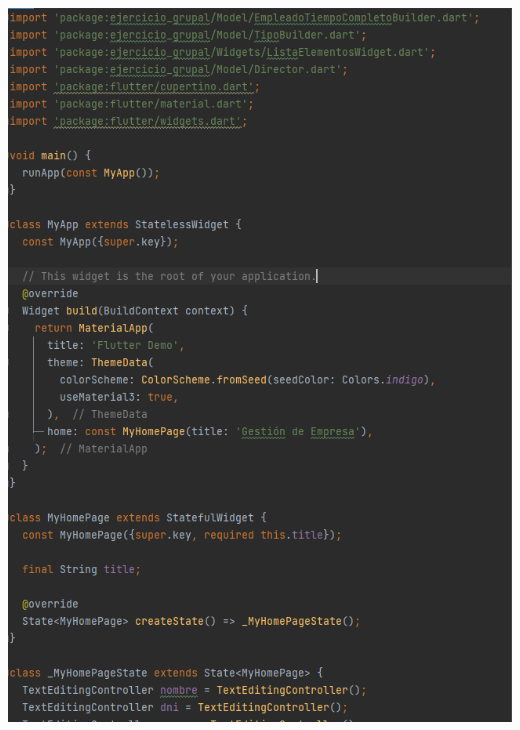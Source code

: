\documentclass[
]{article}
\begin{document}
\includegraphics[width=5.90625in,height=7.65139in]{imagenes/main1.png}
\end{document}
